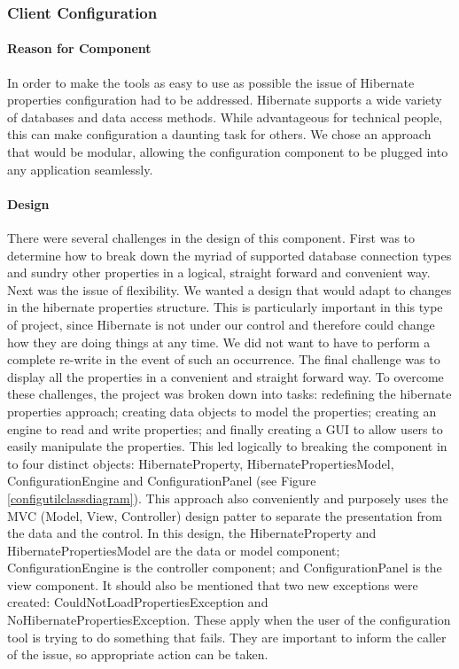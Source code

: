 \subsubsection{Client Configuration}

\paragraph{Reason for Component}
In order to make the tools as easy to use as possible the issue of Hibernate properties configuration had to be addressed. Hibernate supports a wide variety of databases and data access methods. While advantageous for technical people, this can make configuration a daunting task for others. We chose an approach that would be modular, allowing the configuration component to be plugged into any application seamlessly.  


\paragraph{Design}
There were several challenges in the design of this component. First was to determine how to break down the myriad of supported database connection types and sundry other properties in a logical, straight forward and convenient way. Next was the issue of flexibility. We wanted a design that would adapt to changes in the hibernate properties structure. This is particularly important in this type of project, since Hibernate is not under our control and therefore could change how they are doing things at any time. We did not want to have to perform a complete re-write in the event of such an occurrence. The final challenge was to display all the properties in a convenient and straight forward way. To overcome these challenges, the project was broken down into tasks: redefining the hibernate properties approach; creating data objects to model the properties; creating an engine to read and write properties; and finally creating a GUI to allow users to easily manipulate the properties. This led logically to breaking the component in to four distinct objects: HibernateProperty, HibernatePropertiesModel, ConfigurationEngine and ConfigurationPanel 
(see Figure \ref{configutilclassdiagram}). This approach also conveniently and purposely uses the MVC (Model, View, Controller) design patter to separate the presentation from the data and the control. In this design, the HibernateProperty and HibernatePropertiesModel are the data or model component; ConfigurationEngine is the controller component; and ConfigurationPanel is the view component. It should also be mentioned that two new exceptions were created: CouldNotLoadPropertiesException and NoHibernatePropertiesException. These apply when the user of the configuration tool is trying to do something that fails. They are important to inform the caller of the issue, so appropriate action can be taken.

